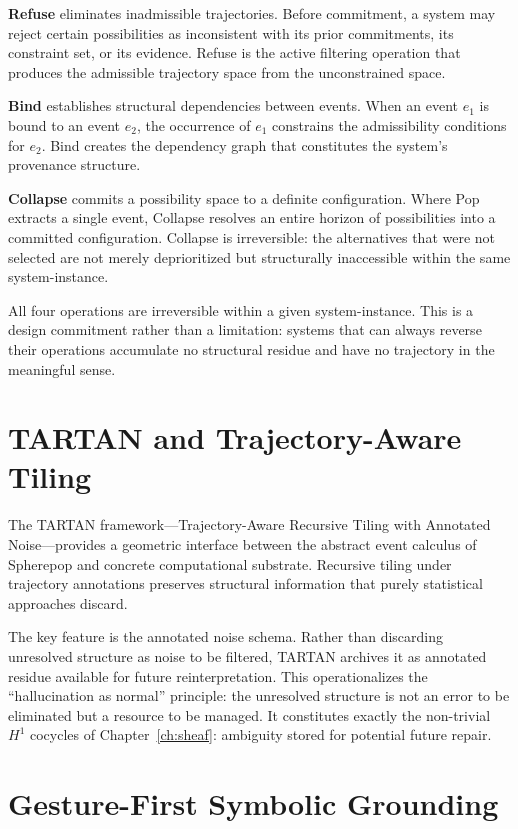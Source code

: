 \textbf{Refuse} eliminates inadmissible trajectories. Before commitment, a system
may reject certain possibilities as inconsistent with its prior commitments,
its constraint set, or its evidence. Refuse is the active filtering operation
that produces the admissible trajectory space from the unconstrained space.

\textbf{Bind} establishes structural dependencies between events. When an event
$e_1$ is bound to an event $e_2$, the occurrence of $e_1$ constrains the
admissibility conditions for $e_2$. Bind creates the dependency graph that
constitutes the system's provenance structure.

\textbf{Collapse} commits a possibility space to a definite configuration. Where
Pop extracts a single event, Collapse resolves an entire horizon of possibilities
into a committed configuration. Collapse is irreversible: the alternatives that
were not selected are not merely deprioritized but structurally inaccessible
within the same system-instance.

\claimD All four operations are irreversible within a given system-instance. This
is a design commitment rather than a limitation: systems that can always reverse
their operations accumulate no structural residue and have no trajectory in the
meaningful sense.

\section{TARTAN and Trajectory-Aware Tiling}

\claimH The TARTAN framework---Trajectory-Aware Recursive Tiling with Annotated
Noise---provides a geometric interface between the abstract event calculus of
Spherepop and concrete computational substrate. Recursive tiling under trajectory
annotations preserves structural information that purely statistical approaches
discard.

The key feature is the annotated noise schema. Rather than discarding unresolved
structure as noise to be filtered, TARTAN archives it as annotated residue
available for future reinterpretation. This operationalizes the ``hallucination
as normal'' principle: the unresolved structure is not an error to be eliminated
but a resource to be managed. It constitutes exactly the non-trivial $H^1$ cocycles
of Chapter~\ref{ch:sheaf}: ambiguity stored for potential future repair.

\section{Gesture-First Symbolic Grounding}
\label{sec:gesture_grounding}

